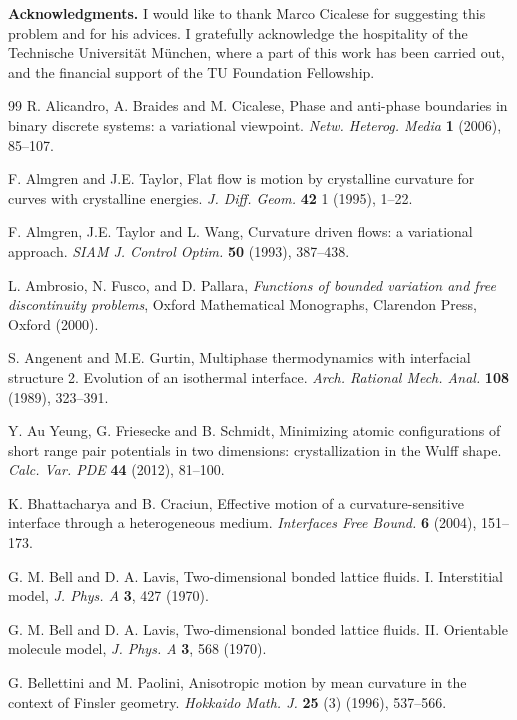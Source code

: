 \documentclass{interact}
\numberwithin{equation}{section}
\theoremstyle{definition}
\begin{document}
\bigskip

\noindent
{\bf Acknowledgments.} I would like to thank Marco Cicalese for suggesting this problem and for his advices. 
I gratefully acknowledge the hospitality of the Technische Universit\"at  M\"unchen, where a part of this work has been carried out, and the financial support of the TU Foundation Fellowship.



\begin{thebibliography} {99}\frenchspacing
{} R. Alicandro, A. Braides and M. Cicalese, Phase and anti-phase boundaries in binary discrete systems: a variational viewpoint. \emph{Netw. Heterog. Media}  {\bf 1} (2006), 85--107.

 F. Almgren and J.E. Taylor, Flat flow is motion by crystalline curvature for curves with crystalline energies. \emph{J. Diff. Geom.} {\bf 42} 1 (1995), 1--22.

 F. Almgren, J.E. Taylor and L. Wang, Curvature driven flows: a variational approach. \emph{SIAM J. Control Optim.} {\bf 50} (1993), 387--438.

 L. Ambrosio, N. Fusco, and D. Pallara, \emph{Functions of bounded variation and free discontinuity problems}, Oxford Mathematical Monographs, Clarendon Press, Oxford (2000).

  S. Angenent and M.E. Gurtin, Multiphase thermodynamics with interfacial structure 2. Evolution of an isothermal interface. \emph{Arch. Rational Mech. Anal.} {\bf 108} (1989), 323--391.

 Y. Au Yeung, G. Friesecke and B. Schmidt, Minimizing atomic configurations of short range pair potentials in two dimensions: crystallization in the Wulff shape. \emph{Calc. Var. PDE} {\bf 44} (2012), 81--100.

 K. Bhattacharya and B. Craciun, Effective motion of a curvature-sensitive interface through a heterogeneous medium. \emph{Interfaces Free Bound.} {\bf 6} (2004), 151--173.

  G. M. Bell and D. A. Lavis, Two-dimensional bonded lattice fluids. I. Interstitial model, \emph{J. Phys. A}
{\bf 3}, 427 (1970).

  G. M. Bell and D. A. Lavis, Two-dimensional bonded lattice fluids. II. Orientable molecule model, \emph{J. Phys. A}
{\bf 3}, 568 (1970).

 G. Bellettini and M. Paolini, Anisotropic motion by mean curvature in the context of Finsler geometry. \emph{Hokkaido Math. J.} {\bf 25} (3) (1996), 537--566.


\end{thebibliography}
\end{document}
